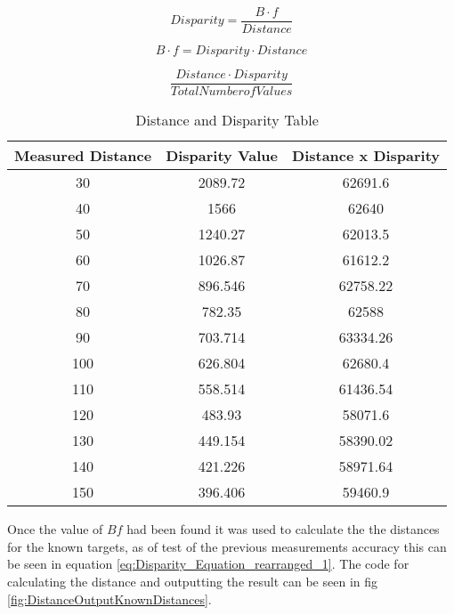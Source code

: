 \documentclass[conference]{IEEEtran}
\begin{document}
\begin{equation} \label{eq:Disparity_Equation}
Disparity = \frac{B \cdot f}{Distance}
\end{equation}

\begin{equation} \label{eq:Disparity_Equation_rearranged_1}
B \cdot f = Disparity \cdot Distance
\end{equation}

\begin{equation} \label{eq:AverageDisparity}
\frac{Distance \cdot Disparity}{Total Number of Values}
\end{equation}

\begin{table}
\begin{center}
\caption{Distance and Disparity Table}
\begin{tabular}{ || c || c || c || }
\hline
 Measured Distance & Disparity Value & Distance x Disparity\\ 
\hline
 30 & 2089.72 & 62691.6 \\  
\hline
 40 & 1566 & 62640 \\  
\hline
 50 & 1240.27 & 62013.5 \\  
\hline
 60 & 1026.87 & 61612.2 \\  
\hline
 70 & 896.546 & 62758.22 \\  
\hline
 80 & 782.35 & 62588 \\  
\hline
 90 & 703.714 & 63334.26 \\  
\hline
 100 & 626.804 & 62680.4 \\  
\hline
 110 & 558.514 & 61436.54 \\  
\hline
 120 & 483.93 & 58071.6 \\  
\hline
 130 & 449.154 & 58390.02 \\  
\hline
 140 & 421.226 & 58971.64 \\  
\hline
 150 & 396.406 & 59460.9 \\  
\hline

\end{tabular}
\label{table:distance_and_disparity_tables}
\end{center}
\end{table}

Once the value of $Bf$ had been found it was used to calculate the the distances for the known targets, as of test of the previous measurements accuracy this can be seen in equation \ref{eq:Disparity_Equation_rearranged_1}. The code for calculating the distance and outputting the result can be seen in fig \ref{fig:DistanceOutputKnownDistances}.
\end{document}
